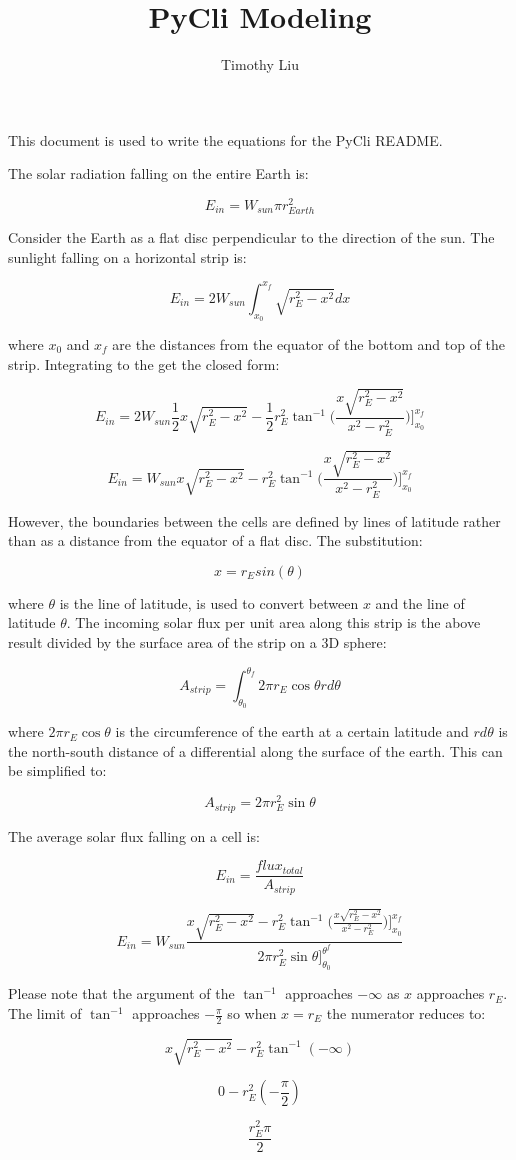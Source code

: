 \documentclass[12pt]{article} %
\title{PyCli Modeling}
\author{Timothy Liu}
\begin{document}
\maketitle

This document is used to write the equations for the PyCli README.

The solar radiation falling on the entire Earth is:

$$E_{in} = W_{sun} \pi r_{Earth}^2$$

Consider the Earth as a flat disc perpendicular to the direction of the sun. The sunlight falling on a horizontal strip is:

$$E_{in} = 2 W_{sun} \int_{x_0}^{x_f} \sqrt{r_{E}^2 - x^2} dx$$


where $x_0$ and $x_f$ are the distances from the equator of the bottom and top of the strip. Integrating to the get the closed form:

$$E_{in} = 2 W_{sun} \frac{1}{2} x \sqrt{r_{E}^2 - x^2} - \frac{1}{2} r_{E}^2 \tan^{-1}\bigg({\frac{x \sqrt{r_{E}^2 - x^2}}{x^2 - r_{E}^2 }}\bigg)\bigg]_{x_0}^{x_f}$$

$$E_{in} = W_{sun} x \sqrt{r_{E}^2 - x^2} -  r_{E}^2 \tan^{-1}\bigg({\frac{x \sqrt{r_{E}^2 - x^2}}{x^2 - r_{E}^2 }}\bigg)\bigg]_{x_0}^{x_f}$$

However, the boundaries between the cells are defined by lines of latitude rather than as a distance from the equator of a flat disc. The substitution: 

$$x = r_{E} sin(\theta) $$

where $\theta$ is the line of latitude, is used to convert between $x$ and the line of latitude $\theta$. The incoming solar flux per
unit area along this strip is the above result divided by the surface area of the strip on a 3D sphere:

$$A_{strip} = \int_{\theta_{0}}^{\theta_{f}} 2 \pi r_{E} \cos{\theta} r d\theta $$

where $2 \pi r_{E} \cos{\theta}$ is the circumference of the earth at a certain latitude and $r d\theta$ is the north-south distance of a differential along the surface of the earth. This can be simplified to:

$$A_{strip} =  2 \pi r_{E}^2 \sin{\theta} $$

The average solar flux falling on a cell is:

$$E_{in} = \frac{flux_{total}}{A_{strip}}$$

$$\boxed{E_{in} = W_{sun}\frac{x \sqrt{r_{E}^2 - x^2} -  r_{E}^2 \tan^{-1}\bigg({\frac{x \sqrt{r_{E}^2 - x^2}}{x^2 - r_{E}^2 }}\bigg)\bigg]_{x_0}^{x_f}}{2 \pi r_{E}^2 \sin{\theta}]_{\theta_0}^{\theta^f}}}$$

Please note that the argument of the $\tan^{-1}$ approaches $-\infty$ as $x$ approaches $r_{E}$. The limit of $\tan^{-1}$ approaches $-\frac{\pi}{2}$ so when $x = r_{E}$ the numerator reduces to:

$$x \sqrt{r_{E}^2 - x^2} -  r_{E}^2 \tan^{-1}(-\infty)$$

$$0 -  r_{E}^2 (-\frac{\pi}{2})$$

$$\frac{r_{E}^2 \pi}{2}$$
\end{document}
